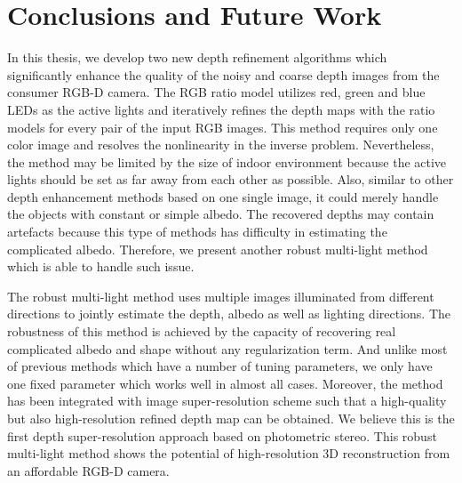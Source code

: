 \chapter{Conclusions and Future Work} \label{chap:conclusion}

In this thesis, we develop two new depth refinement algorithms which significantly enhance the quality of the noisy and coarse depth images from the consumer RGB-D camera. 
The RGB ratio model utilizes red, green and blue LEDs as the active lights and iteratively refines the depth maps with the ratio models for every pair of the input RGB images. 
This method requires only one color image and resolves the nonlinearity in the inverse problem.
Nevertheless, the method may be limited by the size of indoor environment because the active lights should be set as far away from each other as possible.
Also, similar to other depth enhancement methods based on one single image, it could merely handle the objects with constant or simple albedo.
The recovered depths may contain artefacts because this type of methods has difficulty in estimating the complicated albedo.
Therefore, we present another robust multi-light method which is able to handle such issue.

The robust multi-light method uses multiple images illuminated from different directions to jointly estimate the depth, albedo as well as lighting directions.
The robustness of this method is achieved by the capacity of recovering real complicated albedo and shape without any regularization term.
And unlike most of previous methods which have a number of tuning parameters, we only have one fixed parameter which works well in almost all cases.  
Moreover, the method has been integrated with image super-resolution scheme such that a high-quality but also high-resolution refined depth map can be obtained.
We believe this is the first depth super-resolution approach based on photometric stereo.
This robust multi-light method shows the potential of high-resolution 3D reconstruction from an affordable RGB-D camera.

